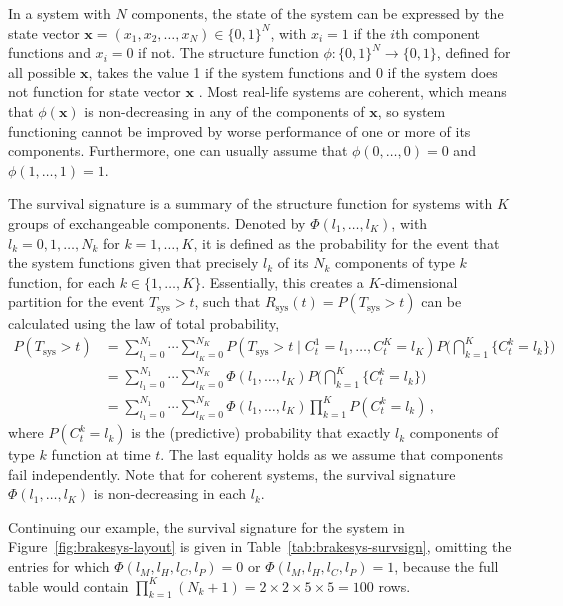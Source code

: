 \documentclass[authoryear]{elsarticle}
\renewcommand{\vec}[1]{{\bm#1}}
\newcommand{\Tsys}{T_\text{sys}}
\newcommand{\Rsys}{R_\text{sys}}
\begin{document}
In a system with $N$ components, the state of the system can be expressed by the state vector
$\vec{x} = (x_1,x_2,\ldots,x_N) \in \{0,1\}^N$,
with $x_i=1$ if the $i$th component functions and $x_i=0$ if not.
The structure function $\phi : \{0,1\}^N \rightarrow \{0,1\}$, defined for all possible $\vec{x}$,
takes the value 1 if the system functions and 0 if the system does not function for state vector $\vec{x}$ \citep{BP75}.
Most real-life systems are coherent,
which means that $\phi(\vec{x})$ is non-decreasing in any of the components of $\vec{x}$,
so system functioning cannot be improved by worse performance of one or more of its components.
Furthermore, one can usually assume that $\phi(0, \ldots, 0) = 0$ and $\phi(1, \ldots, 1) = 1$.

The survival signature \citep{2012:survsign} is a summary of the structure function
for systems with $K$ groups of exchangeable components.
Denoted by $\Phi(l_1,\ldots,l_K)$, with $l_k=0,1,\ldots,N_k$ for $k=1,\ldots,K$,
it is defined as the probability for the event that the system functions
given that precisely $l_k$ of its $N_k$ components of type $k$ function, for each $k\in \{1,\ldots,K\}$.
Essentially, this creates a $K$-dimensional partition for the event $\Tsys > t$,
such that $\Rsys(t) = P(\Tsys > t)$ can be calculated using the law of total probability,
\begin{align}
P(\Tsys > t) &= \sum_{l_1=0}^{N_1} \cdots \sum_{l_K=0}^{N_K} P(\Tsys > t \mid C^1_t = l_1,\ldots, C^K_t = l_K)
                                                                                  P\Big( \bigcap_{k=1}^K \{ C^k_t = l_k\} \Big) \nonumber\\
             &= \sum_{l_1=0}^{N_1} \cdots \sum_{l_K=0}^{N_K} \Phi(l_1,\ldots,l_K) P\Big( \bigcap_{k=1}^K \{ C^k_t = l_k\} \Big) \nonumber\\
             &= \sum_{l_1=0}^{N_1} \cdots \sum_{l_K=0}^{N_K} \Phi(l_1,\ldots,l_K) \prod_{k=1}^K P(C^k_t = l_k)\,,
\label{eq:sysrel-survsign}
\end{align}
where $P(C^k_t = l_k)$ is the (predictive) probability that exactly $l_k$ components of type $k$ function at time $t$.
The last equality holds as we assume that components fail independently.
Note that for coherent systems, the survival signature $\Phi(l_1,\ldots,l_K)$ is non-decreasing in each $l_k$.

Continuing our example,
the survival signature for the system in Figure~\ref{fig:brakesys-layout} is given in Table~\ref{tab:brakesys-survsign},
omitting the entries for which $\Phi(l_M, l_H, l_C, l_P) = 0$ or $\Phi(l_M, l_H, l_C, l_P) = 1$,
because the full table would contain $\prod_{k=1}^K (N_k + 1) = 2 \times 2 \times 5 \times 5 = 100$ rows.
\end{document}
